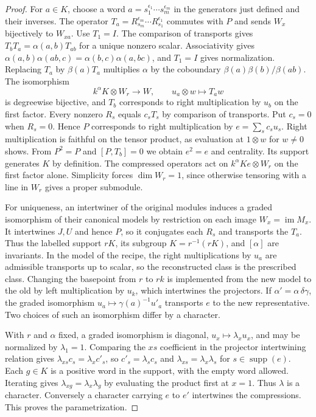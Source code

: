 \documentclass[11pt]{amsart}
\theoremstyle{definition}
\newcommand{\supp}{\operatorname{supp}}
\newcommand{\im}{\operatorname{im}}
\begin{document}
\begin{proof}
For $a\in K$, choose a word $a=s_1^{\epsilon_1}\cdots s_m^{\epsilon_m}$ in the generators just defined and their inverses. The operator $T_a=R_{s_m}^{\epsilon_m}\cdots R_{s_1}^{\epsilon_1}$ commutes with $P$ and sends $W_x$ bijectively to $W_{xa}$. Use $T_1=I$. The comparison of transports gives $T_bT_a=\alpha(a,b)T_{ab}$ for a unique nonzero scalar. Associativity gives $\alpha(a,b)\alpha(ab,c)=\alpha(b,c)\alpha(a,bc)$, and $T_1=I$ gives normalization. Replacing $T_a$ by $\beta(a)T_a$ multiplies $\alpha$ by the coboundary $\beta(a)\beta(b)/\beta(ab)$. The isomorphism
\[
 k^\alpha K\otimes W_r\longrightarrow W,\qquad u_a\otimes w\longmapsto T_aw
\]
is degreewise bijective, and $T_b$ corresponds to right multiplication by $u_b$ on the first factor. Every nonzero $R_s$ equals $c_s T_s$ by comparison of transports. Put $c_s=0$ when $R_s=0$. Hence $P$ corresponds to right multiplication by $e=\sum_s c_su_s$. Right multiplication is faithful on the tensor product, as evaluation at $1\otimes w$ for $w\ne0$ shows. From $P^2=P$ and $[P,T_b]=0$ we obtain $e^2=e$ and centrality. Its support generates $K$ by definition. The compressed operators act on $k^\alpha K e\otimes W_r$ on the first factor alone. Simplicity forces $\dim W_r=1$, since otherwise tensoring with a line in $W_r$ gives a proper submodule.

For uniqueness, an intertwiner of the original modules induces a graded isomorphism of their canonical models by restriction on each image $W_x=\im M_x$. It intertwines $J,U$ and hence $P$, so it conjugates each $R_s$ and transports the $T_a$. Thus the labelled support $rK$, its subgroup $K=r^{-1}(rK)$, and $[\alpha]$ are invariants. In the model of the recipe, the right multiplications by $u_a$ are admissible transports up to scalar, so the reconstructed class is the prescribed class. Changing the basepoint from $r$ to $rk$ is implemented from the new model to the old by left multiplication by $u_k$, which intertwines the projectors. If $\alpha'=\alpha\,\delta\gamma$, the graded isomorphism $u_a\mapsto\gamma(a)^{-1}u'_a$ transports $e$ to the new representative. Two choices of such an isomorphism differ by a character.

With $r$ and $\alpha$ fixed, a graded isomorphism is diagonal, $u_x\mapsto\lambda_xu_x$, and may be normalized by $\lambda_1=1$. Comparing the $xs$ coefficient in the projector intertwining relation gives $\lambda_{xs}c_s=\lambda_x c'_s$, so $c'_s=\lambda_s c_s$ and $\lambda_{xs}=\lambda_x\lambda_s$ for $s\in\supp(e)$. Each $g\in K$ is a positive word in the support, with the empty word allowed. Iterating gives $\lambda_{xg}=\lambda_x\lambda_g$ by evaluating the product first at $x=1$. Thus $\lambda$ is a character. Conversely a character carrying $e$ to $e'$ intertwines the compressions. This proves the parametrization.
\end{proof}
\end{document}
